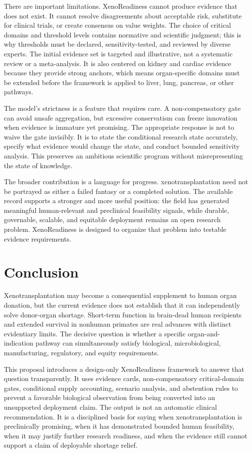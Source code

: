 \documentclass[conference]{IEEEtran}
\newcommand{\xeno}{xenotransplantation}
\begin{document}
There are important limitations. XenoReadiness cannot produce evidence that does not exist. It cannot resolve disagreements about acceptable risk, substitute for clinical trials, or create consensus on value weights. The choice of critical domains and threshold levels contains normative and scientific judgment; this is why thresholds must be declared, sensitivity-tested, and reviewed by diverse experts. The initial evidence set is targeted and illustrative, not a systematic review or a meta-analysis. It is also centered on kidney and cardiac evidence because they provide strong anchors, which means organ-specific domains must be extended before the framework is applied to liver, lung, pancreas, or other pathways.

The model's strictness is a feature that requires care. A non-compensatory gate can avoid unsafe aggregation, but excessive conservatism can freeze innovation when evidence is immature yet promising. The appropriate response is not to waive the gate invisibly. It is to state the conditional research state accurately, specify what evidence would change the state, and conduct bounded sensitivity analysis. This preserves an ambitious scientific program without misrepresenting the state of knowledge.

The broader contribution is a language for progress. \xeno{} need not be portrayed as either a failed fantasy or a completed solution. The available record supports a stronger and more useful position: the field has generated meaningful human-relevant and preclinical feasibility signals, while durable, governable, scalable, and equitable deployment remains an open research problem. XenoReadiness is designed to organize that problem into testable evidence requirements.

\section{Conclusion}

Xenotransplantation may become a consequential supplement to human organ donation, but the current evidence does not establish that it can independently solve donor-organ shortage. Short-term function in brain-dead human recipients and extended survival in nonhuman primates are real advances with distinct evidentiary limits. The decisive question is whether a specific organ-and-indication pathway can simultaneously satisfy biological, microbiological, manufacturing, regulatory, and equity requirements.

This proposal introduces a design-only XenoReadiness framework to answer that question transparently. It uses evidence cards, non-compensatory critical-domain gates, conditional supply accounting, scenario analysis, and abstention rules to prevent a favorable biological observation from being converted into an unsupported deployment claim. The output is not an automatic clinical recommendation. It is a disciplined basis for saying when xenotransplantation is preclinically promising, when it has demonstrated bounded human feasibility, when it may justify further research readiness, and when the evidence still cannot support a claim of deployable shortage relief.
\end{document}

